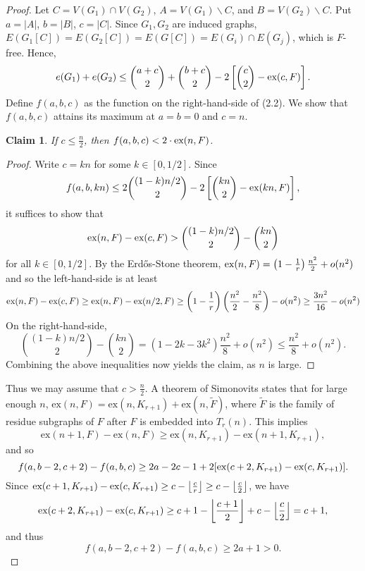 \documentclass[12pt]{report}
\newtheorem{claim}{Claim}
\begin{document}
\begin{proof}
  Let $C = V(G_1) \cap V(G_2)$, $A = V(G_1) \backslash C$, and $B = V(G_2) \backslash C$. Put $a =
  |A|$, $b = |B|$, $c = |C|$. Since $G_1, G_2$ are induced graphs, $E(G_1[C]) =
  E(G_2[C]) = E(G[C]) = E(G_i) \cap E(G_j)$, which is $F$-free. Hence, 
  \begin{gather}
    e(G_1) + e(G_2) \leq \binom{a + c}{2} +  \binom{b + c}{2} - 2\left[\binom{c}{2} - \textnormal{ex}(c, F)\right].
  \end{gather}
  Define $f(a, b, c)$ as the function on the right-hand-side of (2.2). We show that $f(a, b, c)$
  attains its maximum at $a = b = 0$ and $c = n$. 

  \begin{claim}
    If $c \leq \frac{n}{2}$, then $f(a, b, c) < 2 \cdot \textnormal{ex}(n, F)$.
  \end{claim}

  \begin{proof}
    Write $c = kn$ for some $k \in [0, 1/2]$. Since
    \[
      f(a, b, kn) \leq 2\binom{(1 - k)n/2}{2} - 2\left[\binom{kn}{2} - \textnormal{ex}(kn, F)\right],
    \]
    it suffices to show that
    \[
      \textnormal{ex}(n, F) - \textnormal{ex}(c, F) > \binom{(1 - k)n/2}{2} - \binom{kn}{2}
    \]
    for all $k \in [0, 1/2]$. By the Erdős-Stone theorem, $\textnormal{ex}(n, F) = \left(1 -
    \frac{1}{r}\right)\frac{n^2}{2} + o(n^2)$ and so the left-hand-side is at least
    \[
      \textnormal{ex}(n, F) - \textnormal{ex}(c, F) \geq \textnormal{ex}(n, F) - \textnormal{ex}(n/2, F) \geq \left(1 - \frac{1}{r}\right)\left(\frac{n^2}{2} - \frac{n^2}{8}\right) - o(n^2) \geq \frac{3n^2}{16} - o(n^2)
    \]
    On the right-hand-side, 
    \[
      \binom{(1 - k)n/2}{2} - \binom{kn}{2} = (1 - 2k - 3k^2)\frac{n^2}{8} + o(n^2) \leq \frac{n^2}{8} + o(n^2).
    \]
    Combining the above inequalities now yields the claim, as $n$ is large.
  \end{proof}
  Thus we may assume that $c > \frac{n}{2}$. A theorem of Simonovits states that for large enough
  $n$, $\text{ex}(n, F) = \text{ex}(n, K_{r + 1}) + \text{ex}(n, \tilde{F})$, where $\tilde{F}$ is
  the family of residue subgraphs of $F$ after $F$ is embedded into $T_r(n)$. This implies 
  \[
    \text{ex}(n + 1, F) - \text{ex}(n, F) \geq \text{ex}(n, K_{r + 1}) - \text{ex}(n + 1, K_{r + 1}),
  \]
  and so
  \[
    f(a, b - 2, c + 2) - f(a, b, c) \geq 2a - 2c - 1 + 2[\textnormal{ex}(c + 2, K_{r + 1}) - \textnormal{ex}(c, K_{r + 1})].
  \]
  Since $\textnormal{ex}(c + 1, K_{r + 1}) - \textnormal{ex}(c, K_{r + 1}) \geq c - \left\lfloor
  \frac{c}{r} \right\rfloor \geq c - \left\lfloor \frac{c}{2} \right\rfloor$, we have
  \[
    \textnormal{ex}(c + 2, K_{r + 1}) - \textnormal{ex}(c, K_{r + 1}) \geq c + 1 - \left\lfloor \frac{c + 1}{2} \right\rfloor + c - \left\lfloor \frac{c}{2} \right\rfloor = c + 1,
  \]
  and thus 
  \[
    f(a, b - 2, c + 2) - f(a, b, c) \geq 2a + 1 > 0.
  \]


\end{proof}
\end{document}
